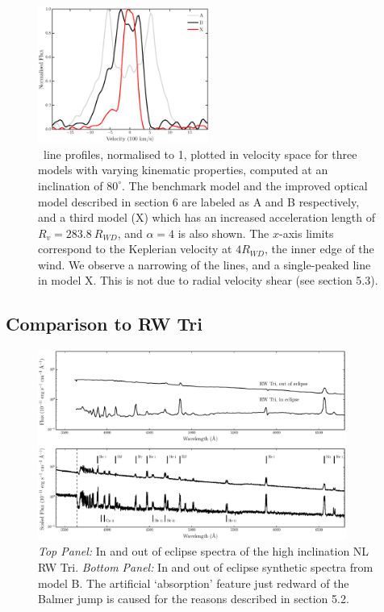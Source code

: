 \documentclass[preprint, a4paper, 11pt]{aastex}
\begin{document}
\begin{figure}
\includegraphics[width=0.5\textwidth]{figures/mc.eps}
\caption{
\ha\ line profiles, normalised to 1, plotted in velocity space 
for three models with varying kinematic 
properties, computed at an inclination of $80^\circ$.
The benchmark model and the improved optical
model described in section 6 are labeled as A and B respectively,
and a third model (X) which has an increased acceleration length of 
$R_v = 283.8~R_{WD}$, and $\alpha=4$ is also shown. 
The $x$-axis limits correspond to the Keplerian velocity at 
$4R_{WD}$, the inner edge of the wind.
We observe a narrowing of the lines, and a single-peaked line in model X.
This is not due to radial velocity shear (see section 5.3).
}
\label{halpha}
\end{figure} %


\subsection{Comparison to RW Tri}

\begin{figure} %
\includegraphics[width=0.9\textwidth]{figures/fig13_eclipse.eps}
\caption{{\sl Top Panel:} In and out of eclipse spectra of the high
inclination NL RW Tri. {\sl Bottom Panel:} In and out of eclipse synthetic
spectra from model B.
The artificial `absorption' feature just redward of the Balmer jump
is caused for the reasons described in section 5.2.}
\label{rwtricomp}
\end{figure} %
\end{document}
